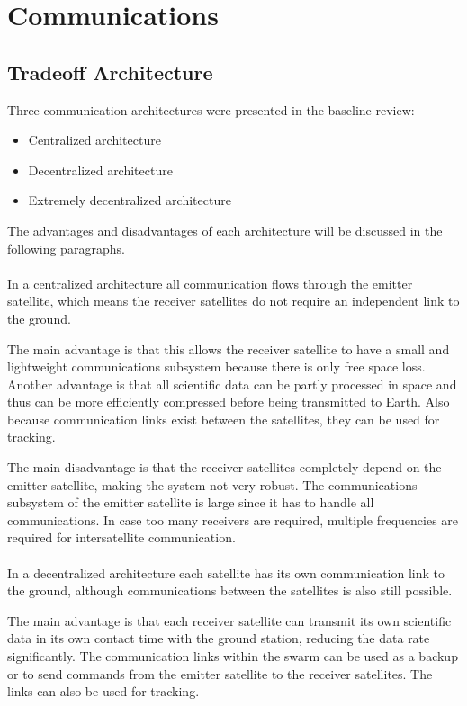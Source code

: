 \section{Communications}
\label{mtrTOCOM}

\subsection{Tradeoff Architecture}
Three communication architectures were presented in the baseline review:
\begin{itemize}
\item Centralized architecture
\item Decentralized architecture
\item Extremely decentralized architecture
\end{itemize}
The advantages and disadvantages of each architecture will be discussed in the following paragraphs.\\\\
In a centralized architecture all communication flows through the emitter satellite, which means the receiver satellites do not require an independent link to the ground.

The main advantage is that this allows the receiver satellite to have a small and lightweight communications subsystem because there is only free space loss. Another advantage is that all scientific data can be partly processed in space and thus can be more efficiently compressed before being transmitted to Earth. Also because communication links exist between the satellites, they can be used for tracking.

The main disadvantage is that the receiver satellites completely depend on the emitter satellite, making the system not very robust. The communications subsystem of the emitter satellite is large since it has to handle all communications. In case too many receivers are required, multiple frequencies are required for intersatellite communication.\\\\
In a decentralized architecture each satellite has its own communication link to the ground, although communications between the satellites is also still possible.

The main advantage is that each receiver satellite can transmit its own scientific data in its own contact time with the ground station, reducing the data rate significantly. The communication links within the swarm can be used as a backup or to send commands from the emitter satellite to the receiver satellites. The links can also be used for tracking.

